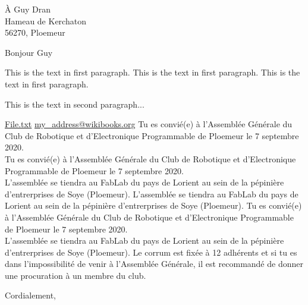 \documentclass[12pt]{lettre}
\makeatletter
\newcommand{\NoRule}{\renewcommand*{\rule@length}{0}}
\makeatother
\begin{document}
   \begin{letter}{À Guy Dran\\Hameau de Kerchaton\\
               56270, Ploemeur
                  }
      
      \NoRule
      \nodate
      \nolieu%
      \address{Nicolas Le Guerroué\\20 rue du roi Arthur\\
               56270, Ploemeur}
      \nofax
      \opening{Bonjour Guy}
      
      
      This is the text in first paragraph. This is the text in first 
paragraph. This is the text in first paragraph. \par
This is the text in second paragraph...

\href{run:main.tex}{File.txt}
       \href{mailto:my_address@wikibooks.org}{my\_address@wikibooks.org}
      Tu es convié(e) à l'Assemblée Générale du Club de Robotique et d'Electronique Programmable de Ploemeur le 7 septembre 2020. \\
      Tu es convié(e) à l'Assemblée Générale du Club de Robotique et d'Electronique Programmable de Ploemeur le 7 septembre 2020. \\
      
      L'assemblée se tiendra au FabLab du pays de Lorient au sein de la pépinière d'entrerprises de Soye (Ploemeur).
      L'assemblée se tiendra au FabLab du pays de Lorient au sein de la pépinière d'entrerprises de Soye (Ploemeur).
      Tu es convié(e) à l'Assemblée Générale du Club de Robotique et d'Electronique Programmable de Ploemeur le 7 septembre 2020. \\
      
      L'assemblée se tiendra au FabLab du pays de Lorient au sein de la pépinière d'entrerprises de Soye (Ploemeur). 
      Le corrum est fixée à 12 adhérents et si tu es dans l'impossibilité de venir à l'Assemblée Générale, il est recommandé de donner une procuration à un membre du club.
      
      \closing{Cordialement, }
     
   \end{letter}
   
   
   
\end{document}
